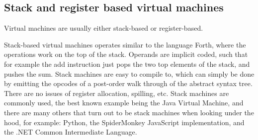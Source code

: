\documentclass[11pt]{report}
\begin{document}




\subsection{Stack and register based virtual machines}
Virtual machines are usually either stack-based or register-based.

Stack-based virtual machines operates similar to the language Forth, where the operations work on the top of the stack. 
Operands are implicit coded, such that for example the add instruction just pops the two top elements of the stack, and pushes the sum. 
Stack machines are easy to compile to, 
which can simply be done by emitting the opcodes of a post-order walk through of the abstract syntax tree. 
There are no issues of register allocation, spilling, etc.
Stack machines are commonly used, the best known example being the Java Virtual Machine, and there are many others that turn out to be stack machines when looking under the hood, for example: Python, the SpiderMonkey JavaScript implementation, and the .NET Common Intermediate Language.
\end{document}
